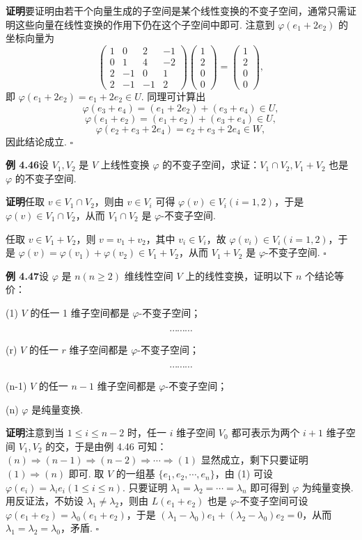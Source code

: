 \documentclass[UTF8,12pt,a4paper,fontset=fandol]{ctexart}
\begin{document}
\noindent\textbf{证明}\quad 要证明由若干个向量生成的子空间是某个线性变换的不变子空间，通常只需证明这些向量在线性变换的作用下仍在这个子空间中即可. 注意到 $\varphi(e_1+2e_2)$ 的坐标向量为
\[
\left(\begin{array}{rrrr}
1 & 0 & 2 & -1\\
0 & 1 & 4 & -2\\
2 & -1 & 0 & 1\\
2 & -1 & -1 & 2
\end{array}\right)
\left(\begin{array}{c}1\\2\\0\\0\end{array}\right)
=
\left(\begin{array}{c}1\\2\\0\\0\end{array}\right),
\]
即 $\varphi(e_1+2e_2)=e_1+2e_2\in U$. 同理可计算出
\[
\varphi(e_3+e_4)=(e_1+2e_2)+(e_3+e_4)\in U,
\]
\[
\varphi(e_1+e_2)=(e_1+e_2)+(e_3+e_4)\in U,
\]
\[
\varphi(e_2+e_3+2e_4)=e_2+e_3+2e_4\in W,
\]
因此结论成立. $\square$

\noindent\textbf{例 4.46}\quad 设 $V_1,V_2$ 是 $V$ 上线性变换 $\varphi$ 的不变子空间，求证：$V_1\cap V_2,V_1+V_2$ 也是 $\varphi$ 的不变子空间.

\noindent\textbf{证明}\quad 任取 $v\in V_1\cap V_2$，则由 $v\in V_i$ 可得 $\varphi(v)\in V_i(i=1,2)$，于是 $\varphi(v)\in V_1\cap V_2$，从而 $V_1\cap V_2$ 是 $\varphi$-不变子空间.

任取 $v\in V_1+V_2$，则 $v=v_1+v_2$，其中 $v_i\in V_i$，故 $\varphi(v_i)\in V_i(i=1,2)$，于是 $\varphi(v)=\varphi(v_1)+\varphi(v_2)\in V_1+V_2$，从而 $V_1+V_2$ 是 $\varphi$-不变子空间. $\square$

\noindent\textbf{例 4.47}\quad 设 $\varphi$ 是 $n(n\ge2)$ 维线性空间 $V$ 上的线性变换，证明以下 $n$ 个结论等价：

(1) $V$ 的任一 1 维子空间都是 $\varphi$-不变子空间；

\[
\cdots\cdots\cdots
\]

(r) $V$ 的任一 $r$ 维子空间都是 $\varphi$-不变子空间；

\[
\cdots\cdots\cdots
\]

(n-1) $V$ 的任一 $n-1$ 维子空间都是 $\varphi$-不变子空间；

(n) $\varphi$ 是纯量变换.

\noindent\textbf{证明}\quad 注意到当 $1\le i\le n-2$ 时，任一 $i$ 维子空间 $V_0$ 都可表示为两个 $i+1$ 维子空间 $V_1,V_2$ 的交，于是由例 4.46 可知：$(n)\Rightarrow(n-1)\Rightarrow(n-2)\Rightarrow\cdots\Rightarrow(1)$ 显然成立，剩下只要证明 $(1)\Rightarrow(n)$ 即可. 取 $V$ 的一组基 $\{e_1,e_2,\cdots,e_n\}$，由 (1) 可设 $\varphi(e_i)=\lambda_ie_i(1\le i\le n)$. 只要证明 $\lambda_1=\lambda_2=\cdots=\lambda_n$ 即可得到 $\varphi$ 为纯量变换. 用反证法，不妨设 $\lambda_1\ne\lambda_2$，则由 $L(e_1+e_2)$ 也是 $\varphi$-不变子空间可设 $\varphi(e_1+e_2)=\lambda_0(e_1+e_2)$，于是 $(\lambda_1-\lambda_0)e_1+(\lambda_2-\lambda_0)e_2=0$，从而 $\lambda_1=\lambda_2=\lambda_0$，矛盾. $\square$
\end{document}
